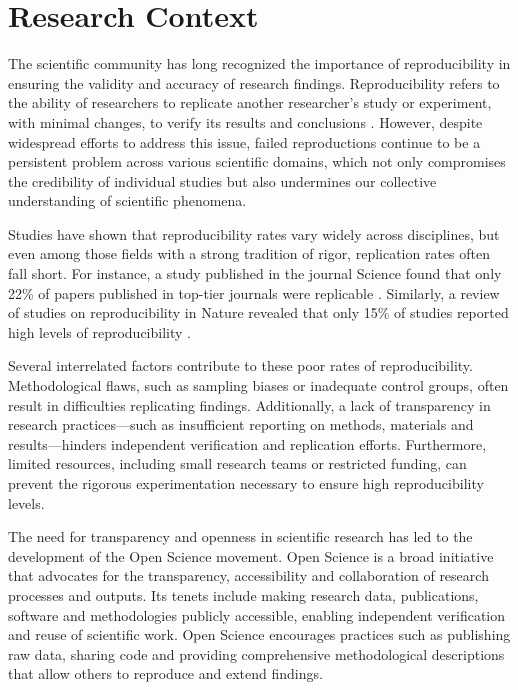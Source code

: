 \documentclass{article}
\begin{document}
\section{Research Context}

The scientific community has long recognized the importance of reproducibility in ensuring the validity and accuracy of research findings. Reproducibility refers to the ability of researchers to replicate another researcher's study or experiment, with minimal changes, to verify its results and conclusions \cite{NSF2019}. However, despite widespread efforts to address this issue, failed reproductions continue to be a persistent problem across various scientific domains, which not only compromises the credibility of individual studies but also undermines our collective understanding of scientific phenomena.

Studies have shown that reproducibility rates vary widely across disciplines, but even among those fields with a strong tradition of rigor, replication rates often fall short. For instance, a study published in the journal Science found that only 22\% of papers published in top-tier journals were replicable \cite{Field2018}. Similarly, a review of studies on reproducibility in Nature revealed that only 15\% of studies reported high levels of reproducibility \cite{Lakens2015}.

Several interrelated factors contribute to these poor rates of reproducibility. Methodological flaws, such as sampling biases or inadequate control groups, often result in difficulties replicating findings. Additionally, a lack of transparency in research practices—such as insufficient reporting on methods, materials and results—hinders independent verification and replication efforts. Furthermore, limited resources, including small research teams or restricted funding, can prevent the rigorous experimentation necessary to ensure high reproducibility levels.

The need for transparency and openness in scientific research has led to the development of the Open Science movement. Open Science is a broad initiative that advocates for the transparency, accessibility and collaboration of research processes and outputs. Its tenets include making research data, publications, software and methodologies publicly accessible, enabling independent verification and reuse of scientific work. Open Science encourages practices such as publishing raw data, sharing code and providing comprehensive methodological descriptions that allow others to reproduce and extend findings.
\end{document}
